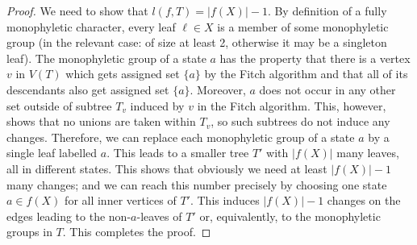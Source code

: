 \documentclass{amsart}
\theoremstyle{definition}
\begin{document}
\begin{proof}
We need to show that $l(f,T)=|f(X)|-1$. By definition of a fully monophyletic character, every leaf $\ell \in X$ is a member of some monophyletic group (in the relevant case: of size at least 2, otherwise it may be a singleton leaf). The monophyletic group of a state $a$ has the property that there is a vertex $v$ in $V(T)$ which gets assigned set $\{a\}$ by the Fitch algorithm and that all of its descendants also get assigned set $\{a\}$. Moreover, $a$ does not occur in any other set outside of subtree $T_v$ induced by $v$ in the Fitch algorithm. This, however, shows that no unions are taken within $T_v$, so such subtrees do not induce any changes. Therefore, we can replace each monophyletic group of a state $a$ by a single leaf labelled $a$. This leads to a smaller tree $T'$ with $|f(X)|$ many leaves, all in different states. This shows that obviously we need at least $|f(X)|-1$ many changes; and we can reach this number precisely by choosing one state $a\in f(X)$ for all inner vertices of $T'$. This induces $|f(X)|-1$ changes on the edges leading to the non-$a$-leaves of $T'$ or, equivalently, to the monophyletic groups in $T$. This completes the proof. 
\end{proof}
\end{document}
